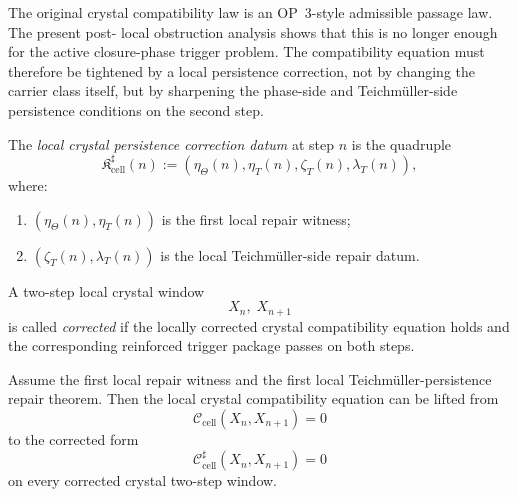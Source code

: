 \begin{remark}
\label{rem:why-crystal-equation-must-be-corrected-locally}
The original crystal compatibility law is an OP~3-style admissible passage law. The present post- local obstruction analysis shows that this is no longer enough for the active closure-phase trigger problem. The compatibility equation must therefore be tightened by a local persistence correction, not by changing the carrier class itself, but by sharpening the phase-side and Teichmüller-side persistence conditions on the second step.
\end{remark}

\begin{definition}
\label{def:local-crystal-persistence-correction-datum}
The \emph{local crystal persistence correction datum} at step $n$ is the quadruple
\[
 \mathfrak K_{\mathrm{cell}}^{\sharp}(n)
 :=
 (\eta_{\Theta}(n),\eta_T(n),\zeta_T(n),\lambda_T(n)),
\]
where:
\begin{enumerate}[leftmargin=2em,label=(\roman*)]
 \item $(\eta_{\Theta}(n),\eta_T(n))$ is the first local repair witness;
 \item $(\zeta_T(n),\lambda_T(n))$ is the local Teichmüller-side repair datum.
\end{enumerate}
\end{definition}

\begin{definition}
\label{def:corrected-crystal-two-step-window}
A two-step local crystal window
\[
 X_n,\;X_{n+1}
\]
is called \emph{corrected} if the locally corrected crystal compatibility equation holds and the corresponding reinforced trigger package passes on both steps.
\end{definition}

\begin{proposition}
\label{prop:teichmueller-repair-lifts-crystal-equation}
Assume the first local repair witness and the first local Teichmüller-persistence repair theorem. Then the local crystal compatibility equation can be lifted from
\[
 \mathcal C_{\mathrm{cell}}(X_n,X_{n+1})=0
\]
to the corrected form
\[
 \mathcal C_{\mathrm{cell}}^{\sharp}(X_n,X_{n+1})=0
\]
on every corrected crystal two-step window.
\end{proposition}

